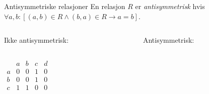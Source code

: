 \begin{frame}[fragile]{Antisymmetriske relasjoner}
    En relasjon $R$ er \emph{antisymmetrisk} hvis $\forall a, b : [(a, b) \in R \land (b, a) \in R \rightarrow a = b]$.\\
    \begin{columns}
        \begin{column}{0.3\textwidth}
            Ikke antisymmetrisk:\\
        \end{column}
        \pause
        \begin{column}{0.3\textwidth}
            Antisymmetrisk:\\
        \end{column}
    \end{columns}
    \pause
    \begin{columns}
        \begin{column}{0.3\textwidth}
            \begin{math}
                \begin{matrix}
                      & a & b & c & d\\
                    a & 0 & 0 & 1 & 0\\
                    b & 0 & 0 & 1 & 0\\
                    c & 1 & 1 & 0 & 0\\

\end{matrix}
\end{math}
\end{column}
\end{columns}
\end{frame}
